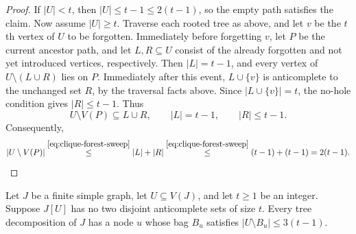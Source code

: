 \begin{proof}
If $|U|<t$, then $|U|\leq t-1\leq2(t-1)$, so the empty path
satisfies the claim. Now assume $|U|\geq t$. Traverse each rooted
tree as above, and let $v$ be the $t$th vertex of $U$ to be forgotten.
Immediately before forgetting $v$, let $P$ be the current ancestor
path, and let $L,R\subseteq U$ consist of the already forgotten and
not yet introduced vertices, respectively. Then $|L|=t-1$, and
every vertex of $U\setminus(L\cup R)$ lies on $P$.
Immediately after this event, $L\cup\{v\}$ is anticomplete to the
unchanged set $R$, by the traversal facts above. Since
$|L\cup\{v\}|=t$, the no-hole condition gives $|R|\le t-1$. Thus
\begin{equation}\label{eq:clique-forest-sweep}
 U\setminus V(P)\subseteq L\cup R,\qquad |L|=t-1,\qquad |R|\leq t-1.
\end{equation}
Consequently,
\[
 |U\setminus V(P)|
 \overset{\eqref{eq:clique-forest-sweep}}{\leq}|L|+|R|
 \overset{\eqref{eq:clique-forest-sweep}}{\leq}(t-1)+(t-1)=2(t-1).
\]
\end{proof}

\begin{lemma}
\label{lem:tw-clique-completion}
Let $J$ be a finite simple graph, let $U\subseteq V(J)$, and let
$t\ge1$ be an integer. Suppose $J[U]$ has no two disjoint
anticomplete sets of size $t$. Every tree decomposition of $J$ has a node $u$ whose bag
$B_u$ satisfies $|U\setminus B_u|\leq3(t-1)$.
\end{lemma}

